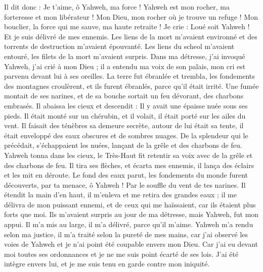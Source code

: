 \begin{multicols}{2}
Il dit donc : Je t'aime, ô Yahweh, ma force !
Yahweh est mon rocher, ma forteresse et mon libérateur ! Mon Dieu, mon rocher où je trouve un refuge ! Mon bouclier, la force qui me sauve, ma haute retraite !
Je crie : Loué soit Yahweh ! Et je suis délivré de mes ennemis.
Les liens de la mort m'avaient environné et des torrents de destruction m'avaient épouvanté.
Les liens du scheol m'avaient entouré, les filets de la mort m'avaient surpris.
Dans ma détresse, j'ai invoqué Yahweh, j'ai crié à mon Dieu ; il a entendu ma voix de son palais, mon cri est parvenu devant lui à ses oreilles.
La terre fut ébranlée et trembla, les fondements des montagnes croulèrent, et ils furent ébranlés, parce qu'il était irrité.
Une fumée montait de ses narines, et de sa bouche sortait un feu dévorant, des charbons embrasés.
Il abaissa les cieux et descendit : Il y avait une épaisse nuée sous ses pieds.
Il était monté sur un chérubin, et il volait, il était porté sur les ailes du vent.
Il faisait des ténèbres sa demeure secrète, autour de lui était sa tente, il était enveloppé des eaux obscures et de sombres nuages.
De la splendeur qui le précédait, s'échappaient les nuées, lançant de la grêle et des charbons de feu.
Yahweh tonna dans les cieux, le Très-Haut fit retentir sa voix avec de la grêle et des charbons de feu.
Il tira ses flèches, et écarta mes ennemis, il lança des éclairs et les mit en déroute.
Le fond des eaux parut, les fondements du monde furent découverts, par ta menace, ô Yahweh ! Par le souffle du vent de tes narines.
Il étendit la main d'en haut, il m'enleva et me retira des grandes eaux ;
il me délivra de mon puissant ennemi, et de ceux qui me haïssaient, car ils étaient plus forts que moi.
Ils m'avaient surpris au jour de ma détresse, mais Yahweh, fut mon appui.
Il m'a mis au large, il m'a délivré, parce qu'il m'aime.
Yahweh m'a rendu selon ma justice, il m'a traité selon la pureté de mes mains,
car j'ai observé les voies de Yahweh et je n'ai point été coupable envers mon Dieu.
Car j'ai eu devant moi toutes ses ordonnances et je ne me suis point écarté de ses lois.
J'ai été intègre envers lui, et je me suis tenu en garde contre mon iniquité.

\end{multicols}
